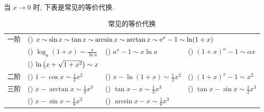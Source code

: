 当 $x\to0$ 时, 下表是常见的等价代换.
\setcounter{magicrownumbers}{0}
\begin{table}[H]
    \centering
    \caption{常见的等价代换}
    \begin{tabular}{c l l l}
        \multirow{3}{*}{一阶} & \multicolumn{3}{l}{(\rownumber{}) $\displaystyle x\sim \sin x\sim \tan x\sim \arcsin x\sim \arctan x\sim \mathrm{e} ^x-1\sim \ln(1+x)$}                                                                                                                                                  \\
                              & (\rownumber{}) $\displaystyle \log_a(1+x)\sim\frac{x}{\ln a}$                                                                   & (\rownumber{}) $\displaystyle a^x-1\sim x\ln a$              & (\rownumber{}) $\displaystyle (1+x)^\alpha-1\sim \alpha x$                      \\
                              & (\rownumber{}) $\ln\qty(x+\sqrt{1+x^2})\sim x$                                                                                                                                                                                                                                   \\
        \midrule
        二阶                  & (\rownumber{}) $\displaystyle 1-\cos x\sim\frac{1}{2}x^2$                                                                       & (\rownumber{}) $\displaystyle x-\ln(1+x)\sim\frac{1}{2}x^2$  & (\rownumber{}) $\displaystyle (1+x)^x-1\sim x^2$                                \\
        \midrule
        \multirow{2}{*}{三阶} & (\rownumber{}) $\displaystyle x-\arctan x\sim\frac{1}{3}x^3$                                                                    & (\rownumber{}) $\displaystyle \tan x-x\sim\frac{1}{3}x^3$    & \multirow{2}{*}{(\rownumber{}) $\displaystyle \tan x-\sin x\sim\frac{1}{2}x^3$} \\
                              & (\rownumber{}) $\displaystyle x-\sin x\sim\frac{1}{6}x^3$                                                                       & (\rownumber{}) $\displaystyle \arcsin x-x\sim\frac{1}{6}x^3$ &                                                                                 \\
    \end{tabular}
\end{table}

